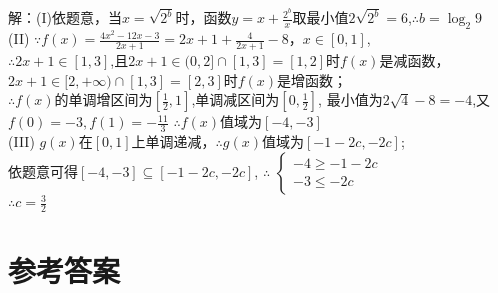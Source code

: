 \begin{exercise}
    \begin{answer}
      解：(I)依题意，当$x=\sqrt{2^b}$时，函数$y=x+\frac{2^b}x$取最小值$2\sqrt{2^b}=6$,$\therefore b=\log_2 9$\\
      (II) $\because f(x)=\frac{4x^2-12x-3}{2x+1}=2x+1+\frac{4}{2x+1}-8，x\in [0,1]$, \\
      $\therefore 2x+1\in[1,3]$,且$2x+1\in(0,2]\cap [1,3]=[1,2]$时$f(x)$是减函数，$2x+1\in[2,+\infty)\cap [1,3]=[2,3]$时$f(x)$是增函数；\\
      $\therefore$$f(x)$的单调增区间为$[\frac12,1]$,单调减区间为$[0,\frac12]$,
      最小值为$2\sqrt4-8=-4$,又$f(0)=-3,f(1)=-\frac{11}3$
      $\therefore f(x)$值域为$[-4,-3]$\\
      (III) $g(x)$在$[0,1]$上单调递减，$\therefore g(x)$值域为$[-1-2c,-2c]$;\\
      依题意可得$[-4,-3]\subseteq[-1-2c,-2c]$,
      $\therefore$
      $\begin{cases}
        -4\geq -1-2c\\
        -3\leq -2c
      \end{cases}$\\
      $\therefore c=\frac32$
    \end{answer}
\end{exercise}
\stopexercise
\hspace{2em}
\newpage
\part{参考答案}
\begin{multicols}{2}
  \printanswer
\end{multicols}

